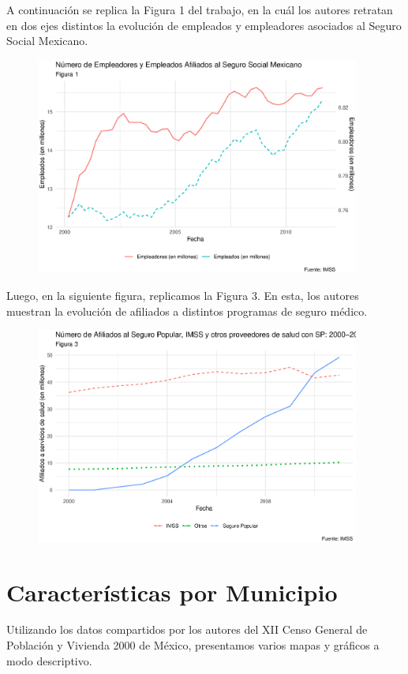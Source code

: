 \documentclass[9pt]{article}
\begin{document}
 A continuaci\'on se replica la Figura 1 del trabajo, en la cu\'al los autores retratan en dos ejes distintos la evoluci\'on de empleados y empleadores asociados al Seguro Social Mexicano.
 \begin{figure}[H]
     \centering
     \includegraphics[width=0.95\textwidth]{figs/employement.eps}
     \label{fig1}
 \end{figure}
 Luego, en la siguiente figura, replicamos la Figura 3. En esta, los autores muestran la evoluci\'on de afiliados a distintos programas de seguro m\'edico.
  \begin{figure}[H]
     \centering
     \includegraphics[width=0.95\textwidth]{figs/figura3.eps}
     \label{fig3}
 \end{figure}
 \section*{Caracter\'isticas por Municipio}
 Utilizando los datos compartidos por los autores del XII Censo General de Población y Vivienda 2000 de M\'exico, presentamos varios mapas y gr\'aficos a modo descriptivo.
 
\end{document}
